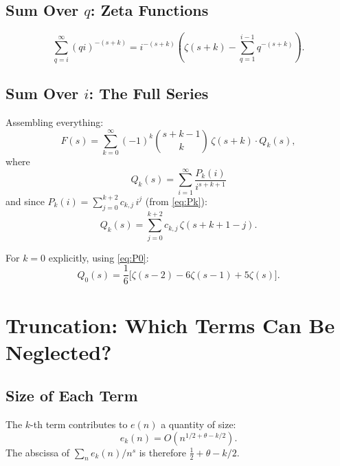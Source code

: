 \documentclass[12pt]{article}
\theoremstyle{definition}
\begin{document}
\subsection{Sum Over \texorpdfstring{$q$}{q}: Zeta Functions}

\begin{equation}
    \sum_{q=i}^\infty (qi)^{-(s+k)}
    = i^{-(s+k)} \left(\zeta(s+k) - \sum_{q=1}^{i-1} q^{-(s+k)}\right).
    \label{eq:qsum}
\end{equation}

\subsection{Sum Over \texorpdfstring{$i$}{i}: The Full Series}

Assembling everything:
\begin{equation}
    F(s) = \sum_{k=0}^\infty (-1)^k \binom{s+k-1}{k}\, \zeta(s+k)\cdot Q_k(s),
    \label{eq:Ffull}
\end{equation}
where
\begin{equation}
    Q_k(s) = \sum_{i=1}^\infty \frac{P_k(i)}{i^{s+k+1}}
    \label{eq:Qk}
\end{equation}
and since $P_k(i) = \sum_{j=0}^{k+2} c_{k,j}\, i^j$ (from \eqref{eq:Pk}):
\begin{equation}
    Q_k(s) = \sum_{j=0}^{k+2} c_{k,j}\, \zeta(s+k+1-j).
    \label{eq:Qkzeta}
\end{equation}

For $k=0$ explicitly, using \eqref{eq:P0}:
\begin{equation}
    \boxed{Q_0(s) = \frac{1}{6}\bigl[\zeta(s-2) - 6\zeta(s-1) + 5\zeta(s)\bigr].}
    \label{eq:Q0}
\end{equation}

\section{Truncation: Which Terms Can Be Neglected?}

\subsection{Size of Each Term}

The $k$-th term contributes to $e(n)$ a quantity of size:
\begin{equation}
    e_k(n) = O\!\left(n^{1/2+\theta-k/2}\right).
    \label{eq:eksize}
\end{equation}
The abscissa of $\sum_n e_k(n)/n^s$ is therefore $\tfrac{1}{2}+\theta - k/2$.
\end{document}
